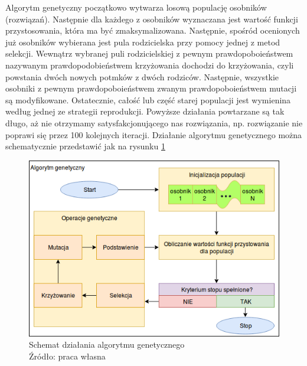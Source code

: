 Algorytm genetyczny początkowo wytwarza losową populację osobników (rozwiązań).
Następnie dla każdego z osobników wyznaczana jest wartość funkcji przystosowania, która ma być zmaksymalizowana.
Następnie, spośród ocenionych już osobników wybierana jest pula rodzicielska przy pomocy jednej z metod selekcji.
Wewnątrz wybranej puli rodzicielskiej z pewnym prawdopoboieństwem nazywanym prawdopodobieństwem krzyżowania dochodzi do krzyżowania, czyli powstania dwóch nowych potmków z dwóch rodziców.
Następnie, wszystkie osobniki z pewnym prawdopoboieństwem zwanym prawdopoboieństwem mutacji są modyfikowane.
Ostatecznie, całość lub część starej populacji jest wymienina według jednej ze strategii reprodukcji.
Powyższe działania powtarzane są tak długo, aż nie otrzymamy satysfakcjonującego nas rozwiązania, np. rozwiązanie nie poprawi się przez 100 kolejnych iteracji.
Działanie algorytmu genetycznego można schematycznie przedstawić jak na rysunku \ref{fig:gen_schemat}

\begin{figure}[h!tb]
	 \centering
	 \includegraphics[width = 1.0\linewidth]{img/genetyczny_schemat}
	 \caption{Schemat działania algorytmu genetycznego \\
              Źródło: praca własna}
	 \label{fig:gen_schemat}
\end{figure}
